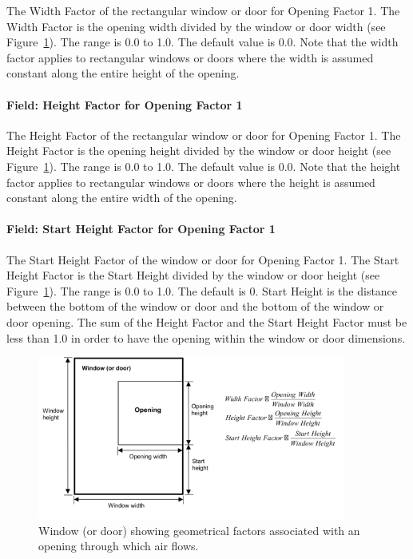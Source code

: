 The Width Factor of the rectangular window or door for Opening Factor 1. The Width Factor is the opening width divided by the window or door width (see Figure~\ref{fig:window-or-door-showing-geometrical-factors}). The range is 0.0 to 1.0. The default value is 0.0. Note that the width factor applies to rectangular windows or doors where the width is assumed constant along the entire height of the opening.

\paragraph{Field: Height Factor for Opening Factor 1}\label{field-height-factor-for-opening-factor-1}

The Height Factor of the rectangular window or door for Opening Factor 1. The Height Factor is the opening height divided by the window or door height (see Figure~\ref{fig:window-or-door-showing-geometrical-factors}). The range is 0.0 to 1.0. The default value is 0.0. Note that the height factor applies to rectangular windows or doors where the height is assumed constant along the entire width of the opening.

\paragraph{Field: Start Height Factor for Opening Factor 1}\label{field-start-height-factor-for-opening-factor-1}

The Start Height Factor of the window or door for Opening Factor 1. The Start Height Factor is the Start Height divided by the window or door height (see Figure~\ref{fig:window-or-door-showing-geometrical-factors}). The range is 0.0 to 1.0. The default is 0. Start Height is the distance between the bottom of the window or door and the bottom of the window or door opening. The sum of the Height Factor and the Start Height Factor must be less than 1.0 in order to have the opening within the window or door dimensions.

\begin{figure}[hbtp] %
\centering
\includegraphics[width=0.9\textwidth, height=0.9\textheight, keepaspectratio=true]{media/image236.png}
\caption{Window (or door) showing geometrical factors associated with an opening through which air flows. \protect \label{fig:window-or-door-showing-geometrical-factors}}
\end{figure}

